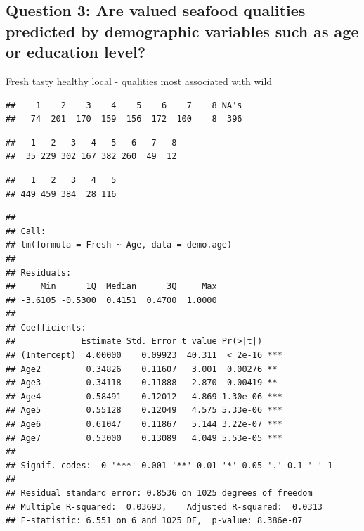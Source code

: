 \documentclass[
  12pt,
]{article}
\begin{document}
\hypertarget{question-3-are-valued-seafood-qualities-predicted-by-demographic-variables-such-as-age-or-education-level}{%
\subsection{Question 3: Are valued seafood qualities predicted by
demographic variables such as age or education
level?}\label{question-3-are-valued-seafood-qualities-predicted-by-demographic-variables-such-as-age-or-education-level}}

Fresh tasty healthy local - qualities most associated with wild

\begin{verbatim}
##    1    2    3    4    5    6    7    8 NA's 
##   74  201  170  159  156  172  100    8  396
\end{verbatim}

\begin{verbatim}
##   1   2   3   4   5   6   7   8 
##  35 229 302 167 382 260  49  12
\end{verbatim}

\begin{verbatim}
##   1   2   3   4   5 
## 449 459 384  28 116
\end{verbatim}

\begin{verbatim}
## 
## Call:
## lm(formula = Fresh ~ Age, data = demo.age)
## 
## Residuals:
##     Min      1Q  Median      3Q     Max 
## -3.6105 -0.5300  0.4151  0.4700  1.0000 
## 
## Coefficients:
##             Estimate Std. Error t value Pr(>|t|)    
## (Intercept)  4.00000    0.09923  40.311  < 2e-16 ***
## Age2         0.34826    0.11607   3.001  0.00276 ** 
## Age3         0.34118    0.11888   2.870  0.00419 ** 
## Age4         0.58491    0.12012   4.869 1.30e-06 ***
## Age5         0.55128    0.12049   4.575 5.33e-06 ***
## Age6         0.61047    0.11867   5.144 3.22e-07 ***
## Age7         0.53000    0.13089   4.049 5.53e-05 ***
## ---
## Signif. codes:  0 '***' 0.001 '**' 0.01 '*' 0.05 '.' 0.1 ' ' 1
## 
## Residual standard error: 0.8536 on 1025 degrees of freedom
## Multiple R-squared:  0.03693,    Adjusted R-squared:  0.0313 
## F-statistic: 6.551 on 6 and 1025 DF,  p-value: 8.386e-07
\end{verbatim}
\end{document}

